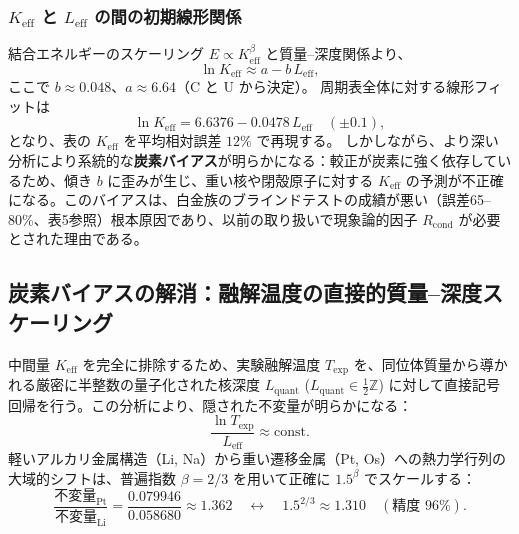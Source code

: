 \documentclass[11pt,a4paper]{article}
\begin{document}
	\subsubsection{\(K_{\mathrm{eff}}\) と \(L_{\mathrm{eff}}\) の間の初期線形関係}
	結合エネルギーのスケーリング \(E \propto K_{\mathrm{eff}}^{\beta}\) と質量–深度関係より、
	\begin{equation}
		\ln K_{\mathrm{eff}} \approx a - b\,L_{\mathrm{eff}},
		\label{eq:lnK_vs_L_old}
	\end{equation}
	ここで \(b \approx 0.048\)、\(a \approx 6.64\)（C と U から決定）。  
	周期表全体に対する線形フィットは
	\[
	\ln K_{\mathrm{eff}} = 6.6376 - 0.0478\,L_{\mathrm{eff}} \quad (\pm 0.1),
	\]
	となり、表の \(K_{\mathrm{eff}}\) を平均相対誤差 \(12\%\) で再現する。  
	しかしながら、より深い分析により系統的な\textbf{炭素バイアス}が明らかになる：較正が炭素に強く依存しているため、傾き \(b\) に歪みが生じ、重い核や閉殻原子に対する \(K_{\mathrm{eff}}\) の予測が不正確になる。このバイアスは、白金族のブラインドテストの成績が悪い（誤差65–80\%、表5参照）根本原因であり、以前の取り扱いで現象論的因子 \(R_{\text{cond}}\) が必要とされた理由である。
	
	\subsection{炭素バイアスの解消：融解温度の直接的質量–深度スケーリング}
	\label{subsec:direct_mass}
	
	中間量 \(K_{\mathrm{eff}}\) を完全に排除するため、実験融解温度 \(T_{\mathrm{exp}}\) を、同位体質量から導かれる厳密に半整数の量子化された核深度 \(L_{\mathrm{quant}}\) (\(L_{\mathrm{quant}} \in \frac{1}{2}\mathbb{Z}\)) に対して直接記号回帰を行う。この分析により、隠された不変量が明らかになる：
	\[
	\frac{\ln T_{\mathrm{exp}}}{L_{\mathrm{eff}}}\approx \text{const}.
	\]
	軽いアルカリ金属構造（Li, Na）から重い遷移金属（Pt, Os）への熱力学行列の大域的シフトは、普遍指数 \(\beta = 2/3\) を用いて正確に \(1.5^{\beta}\) でスケールする：
	\[
	\frac{\text{不変量}_{\mathrm{Pt}}}{\text{不変量}_{\mathrm{Li}}}=\frac{0.079946}{0.058680}\approx 1.362 \quad \longleftrightarrow \quad 1.5^{2/3}\approx 1.310 \quad (\text{精度 } 96\%).
	\]
	
\end{document}
